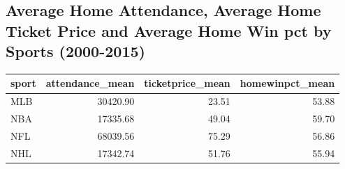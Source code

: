 \documentclass[man, fleqn, noextraspace,floatsintext]{apa6}
\newenvironment{Shaded}{\begin{snugshade}}{\end{snugshade}}
\newcommand{\KeywordTok}[1]{\textcolor[rgb]{0.13,0.29,0.53}{\textbf{#1}}}
\newcommand{\DataTypeTok}[1]{\textcolor[rgb]{0.13,0.29,0.53}{#1}}
\newcommand{\DecValTok}[1]{\textcolor[rgb]{0.00,0.00,0.81}{#1}}
\newcommand{\StringTok}[1]{\textcolor[rgb]{0.31,0.60,0.02}{#1}}
\newcommand{\OperatorTok}[1]{\textcolor[rgb]{0.81,0.36,0.00}{\textbf{#1}}}
\newcommand{\NormalTok}[1]{#1}
\begin{document}
\subsection{Average Home Attendance, Average Home Ticket Price and
Average Home Win pct by Sports
(2000-2015)}\label{average-home-attendance-average-home-ticket-price-and-average-home-win-pct-by-sports-2000-2015}

\begin{Shaded}
\end{Shaded}

\begin{tabular}{l|r|r|r}
\hline
sport & attendance\_mean & ticketprice\_mean & homewinpct\_mean\\
\hline
MLB & 30420.90 & 23.51 & 53.88\\
\hline
NBA & 17335.68 & 49.04 & 59.70\\
\hline
NFL & 68039.56 & 75.29 & 56.86\\
\hline
NHL & 17342.74 & 51.76 & 55.94\\
\hline
\end{tabular}
\end{document}
